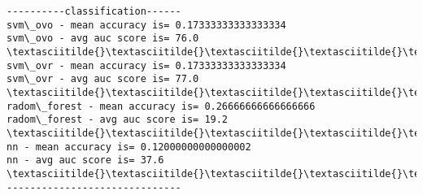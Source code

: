 \documentclass[11pt]{article}
\begin{document}
    \begin{Verbatim}[commandchars=\\\{\}]
----------classification------
svm\_ovo - mean accuracy is= 0.17333333333333334
svm\_ovo - avg auc score is= 76.0
\textasciitilde{}\textasciitilde{}\textasciitilde{}\textasciitilde{}\textasciitilde{}\textasciitilde{}\textasciitilde{}\textasciitilde{}\textasciitilde{}\textasciitilde{}\textasciitilde{}\textasciitilde{}\textasciitilde{}\textasciitilde{}\textasciitilde{}\textasciitilde{}\textasciitilde{}\textasciitilde{}\textasciitilde{}\textasciitilde{}\textasciitilde{}\textasciitilde{}\textasciitilde{}\textasciitilde{}\textasciitilde{}\textasciitilde{}\textasciitilde{}\textasciitilde{}\textasciitilde{}
svm\_ovr - mean accuracy is= 0.17333333333333334
svm\_ovr - avg auc score is= 77.0
\textasciitilde{}\textasciitilde{}\textasciitilde{}\textasciitilde{}\textasciitilde{}\textasciitilde{}\textasciitilde{}\textasciitilde{}\textasciitilde{}\textasciitilde{}\textasciitilde{}\textasciitilde{}\textasciitilde{}\textasciitilde{}\textasciitilde{}\textasciitilde{}\textasciitilde{}\textasciitilde{}\textasciitilde{}\textasciitilde{}\textasciitilde{}\textasciitilde{}\textasciitilde{}\textasciitilde{}\textasciitilde{}\textasciitilde{}\textasciitilde{}\textasciitilde{}\textasciitilde{}
radom\_forest - mean accuracy is= 0.26666666666666666
radom\_forest - avg auc score is= 19.2
\textasciitilde{}\textasciitilde{}\textasciitilde{}\textasciitilde{}\textasciitilde{}\textasciitilde{}\textasciitilde{}\textasciitilde{}\textasciitilde{}\textasciitilde{}\textasciitilde{}\textasciitilde{}\textasciitilde{}\textasciitilde{}\textasciitilde{}\textasciitilde{}\textasciitilde{}\textasciitilde{}\textasciitilde{}\textasciitilde{}\textasciitilde{}\textasciitilde{}\textasciitilde{}\textasciitilde{}\textasciitilde{}\textasciitilde{}\textasciitilde{}\textasciitilde{}\textasciitilde{}
nn - mean accuracy is= 0.12000000000000002
nn - avg auc score is= 37.6
\textasciitilde{}\textasciitilde{}\textasciitilde{}\textasciitilde{}\textasciitilde{}\textasciitilde{}\textasciitilde{}\textasciitilde{}\textasciitilde{}\textasciitilde{}\textasciitilde{}\textasciitilde{}\textasciitilde{}\textasciitilde{}\textasciitilde{}\textasciitilde{}\textasciitilde{}\textasciitilde{}\textasciitilde{}\textasciitilde{}\textasciitilde{}\textasciitilde{}\textasciitilde{}\textasciitilde{}\textasciitilde{}\textasciitilde{}\textasciitilde{}\textasciitilde{}\textasciitilde{}
------------------------------

    \end{Verbatim}
\end{document}
